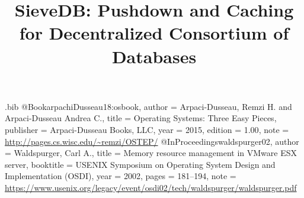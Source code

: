 \begin{filecontents}{\jobname.bib}
@Book{arpachiDusseau18:osbook,
  author =       {Arpaci-Dusseau, Remzi H. and Arpaci-Dusseau Andrea C.},
  title =        {Operating Systems: Three Easy Pieces},
  publisher =    {Arpaci-Dusseau Books, LLC},
  year =         2015,
  edition =      {1.00},
  note =         {\url{http://pages.cs.wisc.edu/~remzi/OSTEP/}}
}
@InProceedings{waldspurger02,
  author =       {Waldspurger, Carl A.},
  title =        {Memory resource management in {VMware ESX} server},
  booktitle =    {USENIX Symposium on Operating System Design and
                  Implementation (OSDI)},
  year =         2002,
  pages =        {181--194},
  note =         {\url{https://www.usenix.org/legacy/event/osdi02/tech/waldspurger/waldspurger.pdf}}}
\end{filecontents}

\newcommand{\showkot}[1]{ {\color{red}{#1}}}
\newcommand{\ours}{SieveDB}


\date{}

\title{\Large \bf \ours : Pushdown and Caching for Decentralized Consortium of Databases}


\maketitle

\begin{abstract}
\showkot{Write later.}
\end{abstract}

